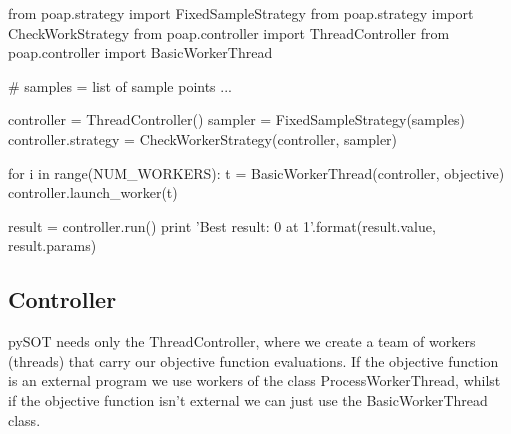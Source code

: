 \documentclass[]{article}
\begin{document}
\begin{python}
from poap.strategy import FixedSampleStrategy
from poap.strategy import CheckWorkStrategy
from poap.controller import ThreadController
from poap.controller import BasicWorkerThread

# samples = list of sample points ...

controller = ThreadController()
sampler = FixedSampleStrategy(samples)
controller.strategy = CheckWorkerStrategy(controller, sampler)

for i in range(NUM_WORKERS):
    t = BasicWorkerThread(controller, objective)
    controller.launch_worker(t)

result = controller.run()
print 'Best result: {0} at {1}'.format(result.value, result.params)
\end{python}

\subsection{Controller} pySOT needs only the ThreadController, where we create a team of workers (threads) that carry our objective function evaluations. If the objective function is an external program we use workers of the class ProcessWorkerThread, whilst if the objective function isn't external we can just use the BasicWorkerThread class.
\end{document}
